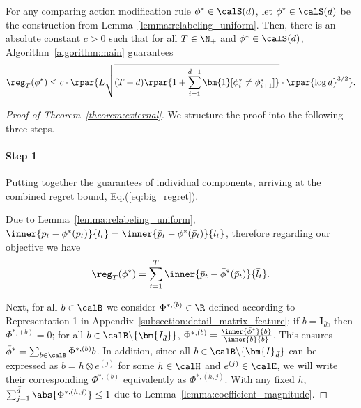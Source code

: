 \documentclass[10pt]{article}
\begin{document}
\begin{theorem}\label{theorem:external}
For any comparing action modification rule $\phi^*\in\calS(d)$, let $\bar\phi^*\in\calS(\bar d)$ be the construction from Lemma~\ref{lemma:relabeling_uniform}. Then, there is an absolute constant $c>0$ such that for all $T\in\N_+$ and $\phi^*\in\calS(d)$, Algorithm~\ref{algorithm:main} guarantees
\begin{equation*}
\reg_T(\phi^*)\leq c\cdot\rpar{L\sqrt{(T+d)\rpar{1+\sum_{i=1}^{\bar d-1}\bm{1}[\bar \phi^*_{i}\neq \bar \phi^*_{i+1}]}}\cdot \rpar{\log d}^{3/2}}.
\end{equation*}
\end{theorem}

\begin{proof}[Proof of Theorem~\ref{theorem:external}]
We structure the proof into the following three steps. 

\paragraph{Step 1} Putting together the guarantees of individual components, arriving at the combined regret bound, Eq.(\ref{eq:big_regret}). 

Due to Lemma~\ref{lemma:relabeling_uniform}, $\inner{p_t-\phi^*(p_t)}{l_t}=\inner{\bar p_t-\bar \phi^*(\bar p_t)}{\bar l_t}$, therefore regarding our objective we have
\begin{equation}\label{eq:regret_first_step}
\reg_T(\phi^*)=\sum_{t=1}^T\inner{\bar p_t-\bar \phi^*(\bar p_t)}{\bar l_t}. 
\end{equation}

Next, for all $b\in\calB$ we consider $\Phi^{*,(b)}\in\R$ defined according to Representation 1 in Appendix~\ref{subsection:detail_matrix_feature}: if $b=\bm{I}_{\bar d}$, then $\Phi^{*,(b)}=0$; for all $b\in\calB\backslash\{\bm{I_{\bar d}}\}$, $\Phi^{*,(b)}=\frac{\inner{\bar\phi^*}{b}}{\inner{b}{b}}$. This ensures $\bar\phi^*=\sum_{b\in\calB}\Phi^{*,(b)}b$. In addition, since all $b\in\calB\backslash\{\bm{I}_{\bar d}\}$ can be expressed as $b=h\otimes e^{(j)}$ for some $h\in\calH$ and $e^{(j)}\in\calE$, we will write their corresponding $\Phi^{*,(b)}$ equivalently as $\Phi^{*,(h,j)}$. With any fixed $h$, $\sum_{j=1}^{\bar d}\abs{\Phi^{*,(h,j)}}\leq 1$ due to Lemma~\ref{lemma:coefficient_magnitude}. 


\end{proof}
\end{document}
